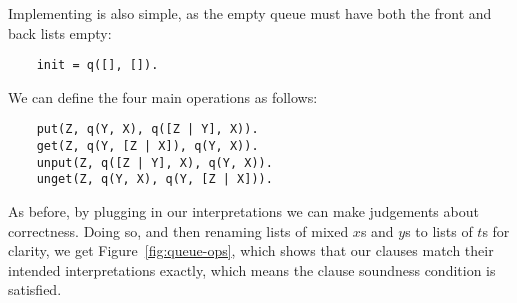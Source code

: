 Implementing  is also simple,
as the empty queue must have both the front and back lists empty:
\begin{verbatim}
    init = q([], []).
\end{verbatim}
We can define the four main operations as follows:
\begin{verbatim}
    put(Z, q(Y, X), q([Z | Y], X)).
    get(Z, q(Y, [Z | X]), q(Y, X)).
    unput(Z, q([Z | Y], X), q(Y, X)).
    unget(Z, q(Y, X), q(Y, [Z | X])).
\end{verbatim}
As before,
by plugging in our interpretations
we can make judgements about correctness.
Doing so,
and then renaming lists of mixed $x$s and $y$s to lists of $t$s for clarity,
we get Figure~\ref{fig:queue-ops},
which shows that our clauses match their intended interpretations exactly,
which means the clause soundness condition is satisfied.
